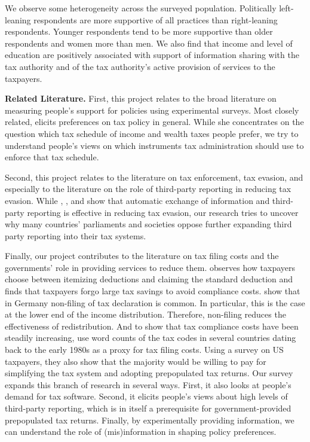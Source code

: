 \documentclass[12pt]{article}
\begin{document}
We observe some heterogeneity across the surveyed population. Politically left-leaning respondents are more supportive of all practices than right-leaning respondents. Younger respondents tend to be more supportive than older respondents and women more than men. We also find that income and level of education are positively associated with support of information sharing with the tax authority and of the tax authority's active provision of services to the taxpayers.





\textbf{Related Literature.}
First, this project relates to the broad literature on measuring people's support for policies using experimental surveys. Most closely related, \textcite{stantcheva2021understanding} elicits preferences on tax policy in general. While she concentrates on the question which tax schedule of income and wealth taxes people prefer, we try to understand people's views on which instruments tax administration should use to enforce that tax schedule. 

Second, this project relates to the literature on tax enforcement, tax evasion, and especially to the literature on the role of third-party reporting in reducing tax evasion. While \textcite{kleven2011unwilling}, \textcite{pomeranz2015no}, \textcite{slemrod2017does} and \textcite{boas2024taxing} show that automatic exchange of information and third-party reporting is effective in reducing tax evasion, our research tries to uncover why many countries' parliaments and societies oppose further expanding third party reporting into their tax systems. 

Finally, our project contributes to the literature on tax filing costs and the governments' role in providing services to reduce them. \textcite{benzarti2020taxing} observes how taxpayers choose between itemizing deductions and claiming the standard deduction and finds that taxpayers forgo large tax savings to avoid compliance costs. \textcite{hauck2024optional} show that in Germany non-filing of tax declaration is common. In particular, this is the case at the lower end of the income distribution. Therefore, non-filing reduces the effectiveness of redistribution. And to show that tax compliance costs have been steadily increasing, \textcite{benzarti2024rising} use word counts of the tax codes in several countries dating back to the early 1980s as a proxy for tax filing costs. Using a survey on US taxpayers, they also show that the majority would be willing to pay for simplifying the tax system and adopting prepopulated tax returns. Our survey expands this branch of research in several ways. First, it also looks at people's demand for tax software. Second, it elicits people's views about high levels of third-party reporting, which is in itself a prerequisite for government-provided prepopulated tax returns. Finally, by experimentally providing information, we can understand the role of (mis)information in shaping policy preferences. 
\printbibliography
\end{document}
